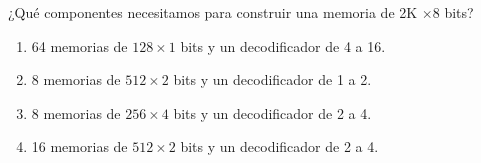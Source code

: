 \documentclass[12pt]{article}
\begin{document}
    \begin{ejercicio}
        ¿Qué componentes necesitamos para construir una memoria de 2K $\times 8$ bits?
        \begin{enumerate}[label=\alph*)]
            \item 64 memorias de $128\times 1$ bits y un decodificador de 4 a 16.
            \item 8 memorias de $512\times 2$ bits y un decodificador de 1 a 2.
            \item 8 memorias de $256\times 4$ bits y un decodificador de 2 a 4.
            \item 16 memorias de $512\times 2$ bits y un decodificador de 2 a 4.
        \end{enumerate}
    \end{ejercicio}

    \newpage
    \setcounter{ejercicio}{0}
\end{document}
